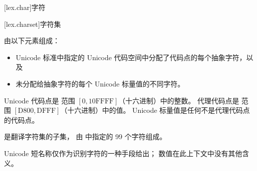 [lex.char]{字符}%

[lex.charset]{字符集}

\pnum
{}%
 由以下元素组成：
\begin{itemize}
\item
Unicode 标准中指定的 Unicode 代码空间中分配了代码点的每个抽象字符，以及
\item
未分配给抽象字符的每个 Unicode 标量值的不同字符。
\end{itemize}
\begin{note}
Unicode 代码点是
范围 $[0, \mathrm{10FFFF}]$（十六进制）中的整数。
代理代码点是
范围 $[\mathrm{D800}, \mathrm{DFFF}]$（十六进制）中的值。
Unicode 标量值是任何不是代理代码点的代码点。
\end{note}

\pnum
{} 是翻译字符集的子集，
由  中指定的 99 个字符组成。
\begin{note}
Unicode 短名称仅作为识别字符的一种手段给出；
数值在此上下文中没有其他含义。
\end{note}

